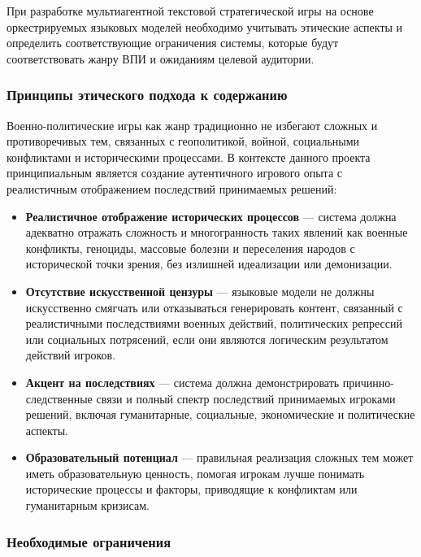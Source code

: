 При разработке мультиагентной текстовой стратегической игры на основе оркестрируемых языковых моделей необходимо учитывать этические аспекты и определить соответствующие ограничения системы, которые будут соответствовать жанру ВПИ и ожиданиям целевой аудитории.

\subsubsection{Принципы этического подхода к содержанию}

Военно-политические игры как жанр традиционно не избегают сложных и противоречивых тем, связанных с геополитикой, войной, социальными конфликтами и историческими процессами. В контексте данного проекта принципиальным является создание аутентичного игрового опыта с реалистичным отображением последствий принимаемых решений:

\begin{itemize}
    \item \textbf{Реалистичное отображение исторических процессов} — система должна адекватно отражать сложность и многогранность таких явлений как военные конфликты, геноциды, массовые болезни и переселения народов с исторической точки зрения, без излишней идеализации или демонизации.

    \item \textbf{Отсутствие искусственной цензуры} — языковые модели не должны искусственно смягчать или отказываться генерировать контент, связанный с реалистичными последствиями военных действий, политических репрессий или социальных потрясений, если они являются логическим результатом действий игроков.

    \item \textbf{Акцент на последствиях} — система должна демонстрировать причинно-следственные связи и полный спектр последствий принимаемых игроками решений, включая гуманитарные, социальные, экономические и политические аспекты.

    \item \textbf{Образовательный потенциал} — правильная реализация сложных тем может иметь образовательную ценность, помогая игрокам лучше понимать исторические процессы и факторы, приводящие к конфликтам или гуманитарным кризисам.
\end{itemize}

\subsubsection{Необходимые ограничения}

